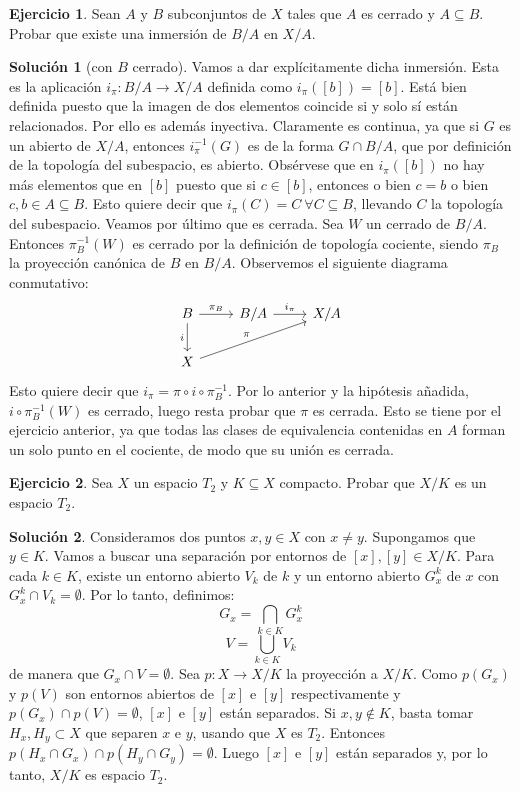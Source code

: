 \documentclass{article}
\theoremstyle{plain}
\theoremstyle{definition}
\newtheorem{exercise}{Ejercicio}
\newtheorem*{sol*}{Solución}
\begin{document}
\newpage
\begin{exercise}
Sean $A$ y $B$ subconjuntos de $X$ tales que $A$ es cerrado y $A \subseteq B$. Probar que existe una inmersión de $B/A$ en $X/A$.
\end{exercise}
\begin{sol*}[con $B$ cerrado]
Vamos a dar explícitamente dicha inmersión. Esta es la aplicación $i_\pi:B/A\rightarrow X/A$ definida como $i_\pi([b])=[b]$. Está bien definida puesto que la imagen de dos elementos coincide si y solo sí están relacionados. Por ello es además inyectiva. Claramente es continua, ya que si $G$ es un abierto de $X/A$, entonces $i_\pi^{-1}(G)$ es de la forma $G\cap B/A$, que por definición de la topología del subespacio, es abierto. Obsérvese que en $i_\pi([b])$ no hay más elementos que en $[b]$ puesto que si $c\in[b]$, entonces o bien $c=b$ o bien $c,b\in A\subseteq B$. Esto quiere decir que $i_\pi(C)=C\ \forall C\subseteq B$, llevando $C$ la topología del subespacio. Veamos por último que es cerrada. Sea $W$ un cerrado de $B/A$. Entonces $\pi_B^{-1}(W)$ es cerrado por la definición de topología cociente, siendo $\pi_B$ la proyección canónica de $B$ en $B/A$. Observemos el siguiente diagrama conmutativo:
\[
\begin{tikzcd}
B\arrow[r,"\pi_B"]\arrow[d,"i"'] & B/A\arrow[r,"i_\pi"] & X/A\\
X\arrow[urr,"\pi"]
\end{tikzcd}
\]
Esto quiere decir que $i_\pi=\pi\circ i\circ \pi_B^{-1}$. Por lo anterior y la hipótesis añadida, $i\circ \pi_B^{-1}(W)$ es cerrado, luego resta probar que $\pi$ es cerrada. Esto se tiene por el ejercicio anterior, ya que todas las clases de equivalencia contenidas en $A$ forman un solo punto en el cociente, de modo que su unión es cerrada. 
\end{sol*}

\newpage
\begin{exercise}
Sea $X$ un espacio $T_2$ y $K \subseteq X$ compacto. Probar que $X/K$ es un espacio $T_2$.
\end{exercise}
\begin{sol*}
Consideramos dos puntos $x, y \in X$ con $x \neq y$. Supongamos que $y\in K$. Vamos a buscar una separación por entornos de $[x],[y] \in X/K$. Para cada $k \in K$, existe un entorno abierto $V_k$ de $k$ y un entorno abierto $G^k_x$ de $x$ con $G^k_x \cap V_k = \emptyset$. Por lo tanto, definimos:
\[ G_x = \bigcap_{k \in K} G^k_x \]
\[ V = \bigcup_{k \in K} V_k \]
de manera que $G_x \cap V = \emptyset$. Sea $p : X \to X/K$ la proyección a $X/K$. Como $p(G_x)$ y $p(V)$ son entornos abiertos de $[x]$ e $[y]$ respectivamente y $p(G_x) \cap p(V) = \emptyset$, $[x]$ e $[y]$ están separados. Si $x,y \notin K$, basta tomar $H_x, H_y \subset X$ que separen $x$ e $y$, usando que $X$ es $T_2$. Entonces $p(H_x \cap G_x) \cap p(H_y \cap G_y) = \emptyset$. Luego $[x]$ e $[y]$ están separados y, por lo tanto, $X/K$ es espacio $T_2$.
\end{sol*}
\end{document}
